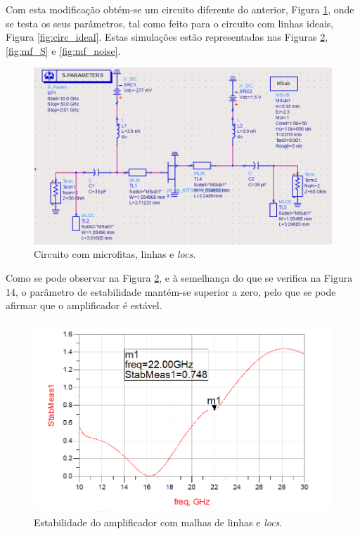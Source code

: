 \documentclass[11pt]{article}
\numberwithin{equation}{section}
\begin{document}
Com esta modificação obtém-se um circuito diferente do anterior, Figura \ref{fig:circuito_mf}, onde se testa os seus parâmetros, tal como feito para o circuito com linhas ideais, Figura \ref{fig:circ_ideal}. Estas simulações estão representadas nas Figuras \ref{fig:mf_est}, \ref{fig:mf_S} e \ref{fig:mf_noise}.

\begin{figure}[H]
	\centering
	\includegraphics[keepaspectratio=true, scale=0.41]{exps/Circuito_mf}
	\vspace{-0.5em}
	\caption{Circuito com microfitas, linhas e \textit{locs}.}
	\vspace{-0.8em}
	\label{fig:circuito_mf}
\end{figure}

Como se pode observar na Figura \ref{fig:mf_est}, e à semelhança do que se verifica na Figura 14, o parâmetro de estabilidade mantém-se superior a zero, pelo que se pode afirmar que o amplificador é estável.

\begin{figure}[H]
	\centering
	\includegraphics[keepaspectratio=true, scale=0.41]{exps/mf_estab}
	\vspace{-0.5em}
	\caption{Estabilidade do amplificador com malhas de linhas e \textit{locs}.}
	\vspace{-0.8em}
	\label{fig:mf_est}
\end{figure}
\end{document}

